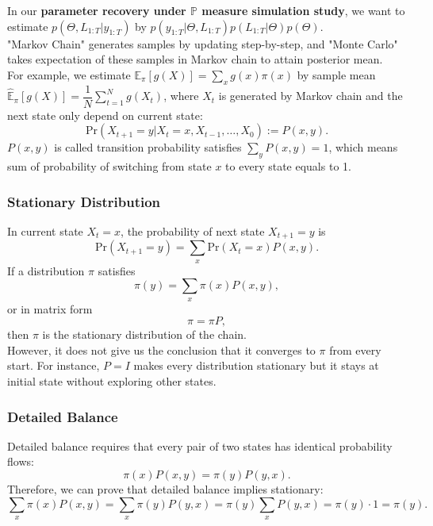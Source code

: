 \documentclass[11pt]{article}
\begin{document}
\noindent In our \textbf{parameter recovery under $\mathbb{P}$ measure simulation study}, we want to estimate $p(\Theta, L_{1:T}|y_{1:T})$ by $p(y_{1:T}|\Theta, L_{1:T})p(L_{1:T}|\Theta)p(\Theta)$. \\"Markov Chain" generates samples by updating step-by-step, and "Monte Carlo" takes expectation of these samples in Markov chain to attain posterior mean.\\
For example, we estimate $\mathbb{E}_\pi[g(X)]=\displaystyle \sum_{x}g(x)\pi(x)$ by sample mean $\widehat{\mathbb{E}}_\pi[g(X)]=\displaystyle \dfrac1N\sum_{t=1}^Ng(X_t)$, where $X_t$ is generated by Markov chain and the next state only depend on current state: $$\mathrm{Pr}(X_{t+1}=y|X_t=x, X_{t-1}, \ldots, X_0):=P(x,y).$$
$P(x,y)$ is called transition probability satisfies $\displaystyle\sum_{y}P(x,y)=1$, which means sum of probability of switching from state $x$ to every state equals to 1.

\subsubsection*{Stationary Distribution}
In current state $X_t=x$, the probability of next state $X_{t+1}=y$ is $$\mathrm{Pr}(X_{t+1}=y)=\sum_{x}\mathrm{Pr}(X_t=x)P(x,y).$$
If a distribution $\pi$ satisfies
$$\pi(y)=\sum_{x}\pi(x)P(x,y),$$ or in matrix form $$\pi=\pi P,$$ then $\pi$ is the stationary distribution of the chain.\\
However, it does not give us the conclusion that it converges to $\pi$ from every start. For instance, $P=I$ makes every distribution stationary but it stays at initial state without exploring other states.

\subsubsection*{Detailed Balance}
Detailed balance requires that every pair of two states has identical probability flows:
$$\pi(x)P(x,y)=\pi(y)P(y,x).$$
Therefore, we can prove that detailed balance implies stationary:
$$\sum_{x}\pi(x)P(x,y)=\sum_{x}\pi(y)P(y,x)=\pi(y)\sum_{x}P(y,x)=\pi(y)\cdot 1=\pi(y).$$
\end{document}
